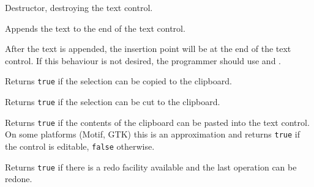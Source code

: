 
Destructor, destroying the text control.


\label{wxtextctrlappendtext}


Appends the text to the end of the text control.




After the text is appended, the insertion point will be at the end of the text control. If this behaviour is not desired,
the programmer should use  and .




\label{wxtextctrlcancopy}


Returns {\tt true} if the selection can be copied to the clipboard.


\label{wxtextctrlcancut}


Returns {\tt true} if the selection can be cut to the clipboard.


\label{wxtextctrlcanpaste}


Returns {\tt true} if the contents of the clipboard can be pasted into the
text control. On some platforms (Motif, GTK) this is an approximation
and returns {\tt true} if the control is editable, {\tt false} otherwise.


\label{wxtextctrlcanredo}


Returns {\tt true} if there is a redo facility available and the last operation
can be redone.


\label{wxtextctrlcanundo}



